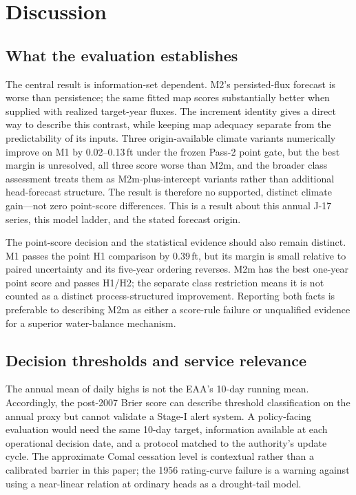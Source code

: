 \documentclass[11pt]{article}
\begin{document}
\section{Discussion}

\subsection{What the evaluation establishes}

The central result is information-set dependent. M2's persisted-flux forecast is worse than persistence; the same fitted map scores substantially better when supplied with realized target-year fluxes. The increment identity gives a direct way to describe this contrast, while keeping map adequacy separate from the predictability of its inputs. Three origin-available climate variants numerically improve on M1 by 0.02--0.13\,ft under the frozen Pass-2 point gate, but the best margin is unresolved, all three score worse than M2m, and the broader class assessment treats them as M2m-plus-intercept variants rather than additional head-forecast structure. The result is therefore no supported, distinct climate gain—not zero point-score differences. This is a result about this annual J-17 series, this model ladder, and the stated forecast origin.

The point-score decision and the statistical evidence should also remain distinct. M1 passes the point H1 comparison by 0.39\,ft, but its margin is small relative to paired uncertainty and its five-year ordering reverses. M2m has the best one-year point score and passes H1/H2; the separate class restriction means it is not counted as a distinct process-structured improvement. Reporting both facts is preferable to describing M2m as either a score-rule failure or unqualified evidence for a superior water-balance mechanism.

\subsection{Decision thresholds and service relevance}

The annual mean of daily highs is not the EAA's 10-day running mean. Accordingly, the post-2007 Brier score can describe threshold classification on the annual proxy but cannot validate a Stage-I alert system. A policy-facing evaluation would need the same 10-day target, information available at each operational decision date, and a protocol matched to the authority's update cycle. The approximate Comal cessation level is contextual rather than a calibrated barrier in this paper; the 1956 rating-curve failure is a warning against using a near-linear relation at ordinary heads as a drought-tail model.
\end{document}

